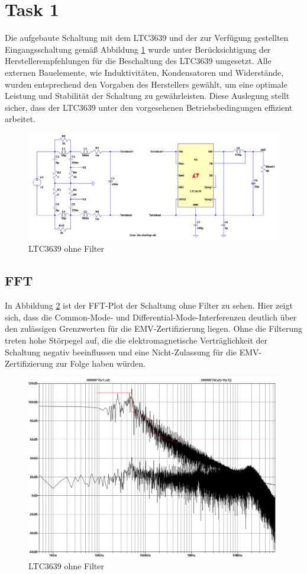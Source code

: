 \section{Task 1} \label{sec:Task1}

Die aufgebaute Schaltung mit dem LTC3639 und der zur Verfügung gestellten Eingangsschaltung gemäß Abbildung \ref{fig:LTC3639OhneFilter} wurde unter Berücksichtigung der Herstellerempfehlungen für die Beschaltung des LTC3639 umgesetzt. Alle externen Bauelemente, wie Induktivitäten, Kondensatoren und Widerstände, wurden entsprechend den Vorgaben des Herstellers gewählt, um eine optimale Leistung und Stabilität der Schaltung zu gewährleisten. Diese Auslegung stellt sicher, dass der LTC3639 unter den vorgesehenen Betriebsbedingungen effizient arbeitet.


\begin{figure}[H]
    \centering
    \includegraphics[width=0.8\linewidth]{Figure/LTC3639OhneFilter.png}
    \caption{LTC3639 ohne Filter}
    \label{fig:LTC3639OhneFilter}
\end{figure}

\subsection{FFT}

In Abbildung \ref{fig:LTC3639OhneFilterFFT} ist der FFT-Plot der Schaltung ohne Filter zu sehen. Hier zeigt sich, dass die Common-Mode- und Differential-Mode-Interferenzen deutlich über den zulässigen Grenzwerten für die EMV-Zertifizierung liegen. Ohne die Filterung treten hohe Störpegel auf, die die elektromagnetische Verträglichkeit der Schaltung negativ beeinflussen und eine Nicht-Zulassung für die EMV-Zertifizierung zur Folge haben würden.


\begin{figure}[H]
    \centering
    \includegraphics[width=0.8\linewidth]{Figure/LTC3639OhneFilterFFT.png}
    \caption{LTC3639 ohne Filter}
    \label{fig:LTC3639OhneFilterFFT}
\end{figure}


